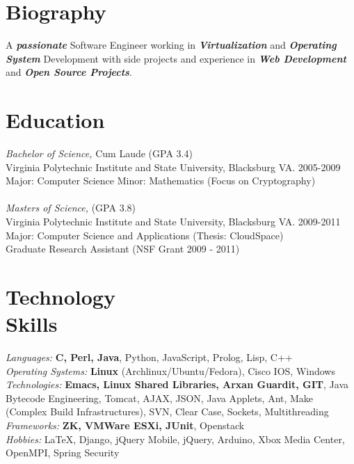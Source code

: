 \documentclass[line,margin]{res}
\begin{document}
\address{2132 Sterling Green Dr, Morrisville, NC 27560}
\address{Email: vtwoods@gmail.com --- Cell: (703)475-1337}

 
\begin{resume}
 
\section{Biography} A \textbf{\emph{passionate}} Software Engineer working in \textbf{\emph{Virtualization}} and \textbf{\emph{Operating System}} Development with side projects and experience in \textbf{\emph{Web Development}} and \textbf{\emph{Open Source Projects}}. 
 
 
\section{Education} {\sl Bachelor of Science,} Cum Laude (GPA 3.4) \\
                Virginia Polytechnic Institute and State University, Blacksburg VA. 2005-2009 \\
                Major: Computer Science Minor: Mathematics (Focus on Cryptography)\\
\\[-5pt]
                {\sl Masters of Science,} (GPA 3.8) \\
                Virginia Polytechnic Institute and State University, Blacksburg VA. 2009-2011 \\
                Major: Computer Science and Applications (Thesis:  CloudSpace) \\
                Graduate Research Assistant (NSF Grant 2009 - 2011)
 
\section{Technology \\ Skills} {\sl Languages:} \textbf{C, Perl, Java}, Python, JavaScript, Prolog, Lisp, C++ \\
                {\sl Operating Systems:} \textbf{Linux} (Archlinux/Ubuntu/Fedora), Cisco IOS, Windows \\
                {\sl Technologies:} \textbf{Emacs, Linux Shared Libraries, Arxan Guardit, GIT}, Java Bytecode Engineering, Tomcat, AJAX, JSON, Java Applets, Ant, Make (Complex Build Infrastructures), SVN, Clear Case, Sockets, Multithreading \\
                {\sl Frameworks:} \textbf{ZK, VMWare ESXi, JUnit}, Openstack \\
                {\sl Hobbies:} \LaTeX, Django, jQuery Mobile, jQuery, Arduino, Xbox Media Center, OpenMPI, Spring Security
 

\end{resume}
\end{document}
